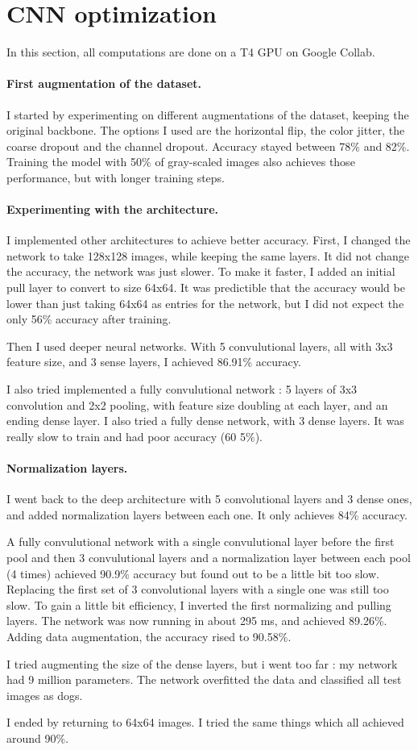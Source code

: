 \documentclass[a4paper,DIV=16]{scrartcl}
\begin{document}
\FloatBarrier
\section{CNN optimization}
In this section, all computations are done on a T4 GPU on Google Collab.

\paragraph{First augmentation of the dataset.}
I started by experimenting on different augmentations of the dataset, keeping the original backbone.
The options I used are the horizontal flip, the color jitter, the coarse dropout and the channel dropout.
Accuracy stayed between 78\% and 82\%.
Training the model with 50\% of gray-scaled images also achieves those performance, but with longer training steps.

\paragraph{Experimenting with the architecture.}
I implemented other architectures to achieve better accuracy.
First, I changed the network to take 128x128 images, while keeping the same layers.
It did not change the accuracy, the network was just slower.
To make it faster, I added an initial pull layer to convert to size 64x64.
It was predictible that the accuracy would be lower than just taking 64x64 as entries for the network, but I did not expect the only 56\% accuracy after training.

Then I used deeper neural networks.
With 5 convulutional layers, all with 3x3 feature size, and 3 sense layers, I achieved 86.91\% accuracy.

I also tried implemented a fully convulutional network : 5 layers of 3x3 convolution and 2x2 pooling, with feature size doubling at each layer, and an ending dense layer.
I also tried a fully dense network, with 3 dense layers.
It was really slow to train and had poor accuracy (60 5\%).

\paragraph{Normalization layers.}
I went back to the deep architecture with 5 convolutional layers and 3 dense ones, and added normalization layers between each one. It only achieves 84\% accuracy.

A fully convulutional network with a single convulutional layer before the first pool and then 3 convulutional layers and a normalization layer between each pool (4 times) achieved 90.9\% accuracy but found out to be a little bit too slow.
Replacing the first set of 3 convolutional layers with a single one was still too slow.
To gain a little bit efficiency, I inverted the first normalizing and pulling layers.
The network was now running in about 295 ms, and achieved 89.26\%.
Adding data augmentation, the accuracy rised to 90.58\%.

I tried augmenting the size of the dense layers, but i went too far : my network had 9 million parameters.
The network overfitted the data and classified all test images as dogs.

I ended by returning to 64x64 images. I tried the same things which all achieved around 90\%.
\end{document}
